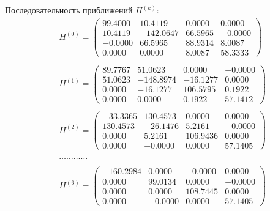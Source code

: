 \documentclass[12pt, a4paper]{article}
\begin{document}
	Последовательность приближений $H^{(k)}$:
	\begin{eqnarray*}
		& H^{(0)} = \begin{pmatrix}
			99.4000	& 10.4119	& 0.0000	& 0.0000\\
			10.4119	& -142.0647	& 66.5965	& -0.0000\\
			-0.0000	& 66.5965	& 88.9314	& 8.0087\\
			0.0000	& 0.0000	& 8.0087	& 58.3333
		\end{pmatrix}\\\\
		& H^{(1)} = \begin{pmatrix}
			89.7767	& 51.0623	& 0.0000	& -0.0000\\
			51.0623	& -148.8974	& -16.1277	& 0.0000\\
			0.0000	& -16.1277	& 106.5795	& 0.1922\\
			0.0000	& 0.0000	& 0.1922	& 57.1412
		\end{pmatrix} \\\\
		& H^{(2)} = \begin{pmatrix}
			-33.3365	& 130.4573 &	0.0000 &	0.0000\\
			130.4573	& -26.1476	& 5.2161	& -0.0000\\
			0.0000	& 5.2161	& 106.9436	& 0.0000\\
			0.0000	& -0.0000	& 0.0000	& 57.1405
		\end{pmatrix} \\\\
		& \ldots\ldots\ldots\ldots \\\\
		& H^{(6)} = \begin{pmatrix}
			-160.2984	& 0.0000	& -0.0000	& 0.0000\\
			0.0000	& 99.0134	& 0.0000	& -0.0000\\
			0.0000	& 0.0000	& 108.7445	& 0.0000\\
			0.0000	& -0.0000	& 0.0000	& 57.1405
		\end{pmatrix}
	\end{eqnarray*}
	
\end{document}
